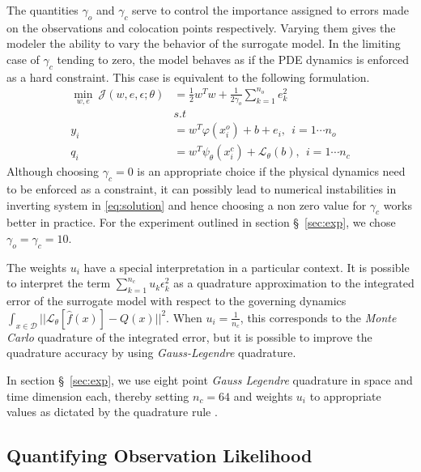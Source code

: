 The quantities $\gamma_o$ and $\gamma_c$ serve to control the importance assigned to errors made 
on the observations and colocation points respectively. Varying them gives the modeler the ability 
to vary the behavior of the surrogate model. In the limiting case of $\gamma_c$ tending to zero, 
the model behaves as if the PDE dynamics is enforced as a hard constraint. This case is equivalent 
to the following formulation.
%
\begin{equation}\label{eq:surrogate2}
   \begin{aligned}
    \min_{w,e} \ \mathcal{J}(w,e,\epsilon;\theta) &= 
    \frac{1}{2} w^{T}w + \frac{1}{2\gamma_{o}} \sum_{k = 1}^{n_{o}}{e^{2}_{k}} \\
    & s.t \\
    y_{i} & = w^{T}\varphi(x^{o}_{i}) + b + e_{i}, \ \ i = 1 \cdots n_{o} \\
    q_{i} & = w^{T}\psi_{\theta}(x^{c}_{i}) + \mathcal{L}_{\theta}(b), \ \ i = 1 \cdots n_{c}
   \end{aligned}
\end{equation}
%
Although choosing $\gamma_c = 0$ is an appropriate choice if the physical dynamics need to be 
enforced as a constraint, it can possibly lead to numerical instabilities in inverting system in 
\cref{eq:solution} and hence choosing a non zero value for $\gamma_c$ works better in practice. For 
the experiment outlined in section \S~\ref{sec:exp}, we chose $\gamma_o = \gamma_c = 10$.

The weights $u_i$ have a special interpretation in a particular context. It is possible to
interpret the term $\sum_{k = 1}^{n_{c}}{u_{k} \epsilon^{2}_{k}}$ as a quadrature approximation
to the integrated error of the surrogate model with respect to the governing dynamics 
$\int_{x \in \mathcal{D}}{||\mathcal{L}_{\theta} [\hat{f}(x)] - Q(x)||^2}$. When 
$u_i = \frac{1}{n_c}$, this corresponds to the \emph{Monte Carlo} quadrature of the integrated 
error, but it is possible to improve the quadrature accuracy by using \emph{Gauss-Legendre} 
quadrature.

In section \S~\ref{sec:exp}, we use eight point \emph{Gauss Legendre} quadrature in space and time 
dimension each, thereby setting $n_c = 64$ and weights $u_i$ to appropriate values as dictated by 
the quadrature rule \citep{_abramowitzm}.

\subsection{Quantifying Observation Likelihood}

